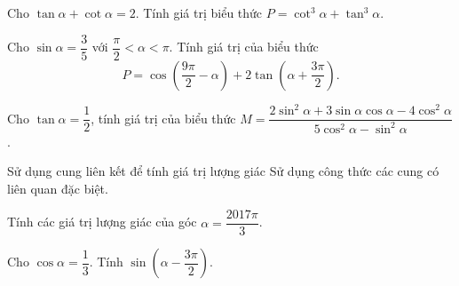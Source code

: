 \begin{bt}%
Cho $\tan \alpha +\cot \alpha =2$. Tính giá trị biểu thức $P=\cot^3\alpha +\tan^3\alpha $.
\end{bt}

\begin{bt}%
Cho $\sin \alpha = \dfrac{3}{5}$ với $\dfrac{\pi}{2} < \alpha < \pi$. Tính giá trị của biểu thức $$P = \cos\left(\dfrac{9\pi}{2}-\alpha\right)+ 2\tan\left(\alpha + \dfrac{3\pi}{2}\right).$$
\end{bt}
\begin{bt}%
Cho $\tan \alpha=\dfrac{1}{2}$, tính giá trị của biểu thức $M=\dfrac{2\sin^2 \alpha+3 \sin \alpha\cos \alpha - 4\cos^2\alpha}{5\cos^2 \alpha-\sin^2 \alpha}$.
\end{bt}

\begin{dang}{Sử dụng cung liên kết để tính giá trị lượng giác}
Sử dụng công thức các cung có liên quan đặc biệt.
\end{dang}
\setcounter{vd}{0}
\begin{vd}%
Tính các giá trị lượng giác của góc $\alpha =\dfrac{2017\pi}{3}$.
\end{vd}

\begin{vd}%
Cho $\cos \alpha=\dfrac{1}{3}$. Tính $\sin\left(\alpha-\dfrac{3\pi}{2}\right)$.
\end{vd}

